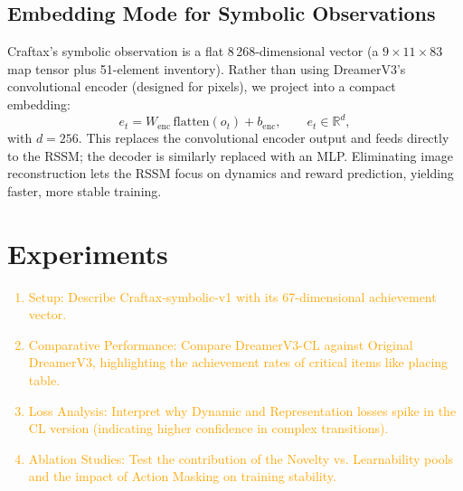 \documentclass{article}
\begin{document}
\subsection{Embedding Mode for Symbolic Observations}
\label{sec:embedding}

Craftax's symbolic observation is a flat 8\,268-dimensional vector
(a $9{\times}11{\times}83$ map tensor plus 51-element inventory).
Rather than using DreamerV3's convolutional encoder (designed for
pixels), we project into a compact embedding:
\begin{equation}
  e_t
  =
  W_{\mathrm{enc}}\,\mathrm{flatten}(o_t)+b_{\mathrm{enc}},
  \qquad
  e_t\in\mathbb{R}^d,
  \label{eq:embedding}
\end{equation}
with $d\!=\!256$.  This replaces the convolutional encoder output and
feeds directly to the RSSM; the decoder is similarly replaced with an
MLP.  Eliminating image reconstruction lets the RSSM focus on dynamics
and reward prediction, yielding faster, more stable training.





\section{Experiments}
\label{sec:experiments}

\textcolor{orange}{
\begin{enumerate}
    \item Setup: Describe Craftax-symbolic-v1 with its 67-dimensional achievement vector.
    \item Comparative Performance: Compare DreamerV3-CL against Original DreamerV3, highlighting the achievement rates of critical items like placing table.
    \item Loss Analysis: Interpret why Dynamic and Representation losses spike in the CL version (indicating higher confidence in complex transitions).
    \item Ablation Studies: Test the contribution of the Novelty vs. Learnability pools and the impact of Action Masking on training stability.
\end{enumerate}
}

\end{document}
